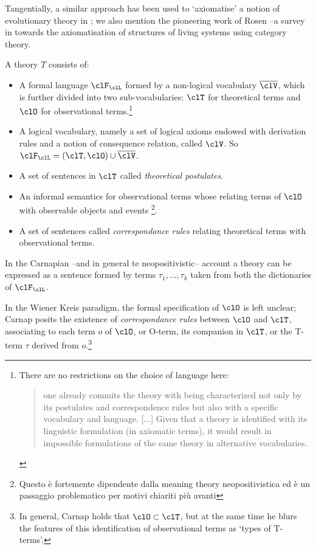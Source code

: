 Tangentially, a similar approach has been used to `axiomatise' a notion of evolutionary theory in \cite{biologia}; we also mention the pioneering work of Rosen --a survey in \cite{letelier2006organizational} towards the axiomatisation of structures of living systems using category theory.
\begin{definition} \cite{krause-foundation}
	A theory $T$ consists of:
	\begin{itemize}
		\item A formal language $\clF_\clL$ formed by a non-logical vocabulary $\overline{\clV}$, which is further divided into two sub-vocabularies: $\clT$ for theoretical terms and $\clO$ for observational terms.\footnote{There are no restrictions on the choice of language here:
			      \begin{quotation}
				      one already commits the theory with being characterized not only by its postulates and correspondence rules but also with a specific vocabulary and language. [...] Given that a theory is identified with its linguistic formulation (in axiomatic terms), it would result in impossible formulations of the same theory in alternative vocabularies. \hspace{\fill}\cite{krause-foundation}
			      \end{quotation}}
		\item A logical vocabulary, namely a set of logical axioms endowed with derivation rules and a notion of consequence relation, called $\clV$. So $\clF_\clL= (\clT,\clO) \cup \overline{\clV}$.
		\item A set of sentences in $\clT$ called \emph{theoretical postulates}.
		\item An informal semantics for observational terms whose relating terms of $\clO$ with observable objects and events \footnote{Questo è fortemente dipendente dalla meaning theory neopositivistica \cite{} ed è un passaggio problematico per motivi chiariti più avanti}.
		\item A set of sentences called \emph{correspondance rules} relating theoretical terms with observational terms.
	\end{itemize}
\end{definition}
In the Carnapian --and in general te neopositivistic-- account a theory can be expressed as a sentence formed by terms $\tau_1, \dots, \tau_k$ taken from both the dictionaries of $\clF_\clL$.

In the Wiener Kreis paradigm, the formal specification of $\clO$ is left unclear; Carnap \cite{carnapfound} posits the existence of \emph{correspondance rules} between $\clO$ and $\clT$, associating to each term $o$ of $\clO$, or O-term, its companion in $\clT$, or the T-term $\tau$ derived from $o$.\footnote{In general, Carnap holds that $\clO \subset \clT$, but at the same time he blurs the features of this identification of observational terms as `types of T-terms'.}

